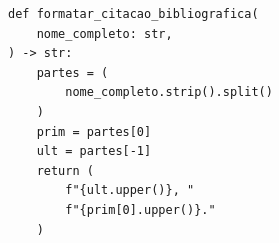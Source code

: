 \ifmostrarGabarito
\begin{verbatim}
def formatar_citacao_bibliografica(
    nome_completo: str,
) -> str:
    partes = (
        nome_completo.strip().split()
    )
    prim = partes[0]
    ult = partes[-1]
    return (
        f"{ult.upper()}, "
        f"{prim[0].upper()}."
    )
\end{verbatim}

\fi
